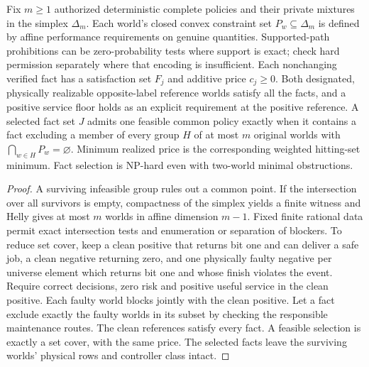 \begin{theorem}\label{adv:ag2}
Fix \(m\ge1\) authorized deterministic complete policies and their private mixtures in the simplex \(\Delta_m\). Each world's closed convex constraint set \(P_w\subseteq\Delta_m\) is defined by affine performance requirements on genuine quantities. Supported-path prohibitions can be zero-probability tests where support is exact; check hard permission separately where that encoding is insufficient. Each nonchanging verified fact has a satisfaction set \(F_j\) and additive price \(c_j\ge0\). Both designated, physically realizable opposite-label reference worlds satisfy all the facts, and a positive service floor holds as an explicit requirement at the positive reference. A selected fact set \(J\) admits one feasible common policy exactly when it contains a fact excluding a member of every group \(H\) of at most \(m\) original worlds with \(\bigcap_{w\in H}P_w=\varnothing\). Minimum realized price is the corresponding weighted hitting-set minimum. Fact selection is NP-hard even with two-world minimal obstructions.
\end{theorem}
\begin{proof}
A surviving infeasible group rules out a common point. If the intersection over all survivors is empty, compactness of the simplex yields a finite witness and Helly gives at most \(m\) worlds in affine dimension \(m-1\). Fixed finite rational data permit exact intersection tests and enumeration or separation of blockers. To reduce set cover, keep a clean positive that returns bit one and can deliver a safe job, a clean negative returning zero, and one physically faulty negative per universe element which returns bit one and whose finish violates the event. Require correct decisions, zero risk and positive useful service in the clean positive. Each faulty world blocks jointly with the clean positive. Let a fact exclude exactly the faulty worlds in its subset by checking the responsible maintenance routes. The clean references satisfy every fact. A feasible selection is exactly a set cover, with the same price. The selected facts leave the surviving worlds' physical rows and controller class intact.
\end{proof}

